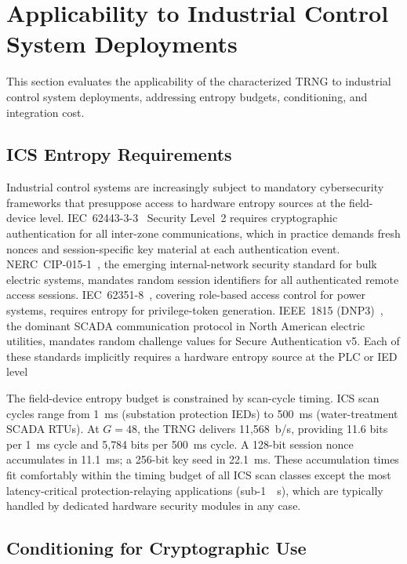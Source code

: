 \documentclass[conference]{IEEEtran}
\begin{document}
\section{Applicability to Industrial Control System Deployments}\label{sec:ics}
This section evaluates the applicability of the characterized TRNG to
industrial control system deployments, addressing entropy budgets,
conditioning, and integration cost.
\subsection{ICS Entropy Requirements}

Industrial control systems are increasingly subject to mandatory
cybersecurity frameworks that presuppose access to hardware entropy
sources at the field-device level.
IEC~62443-3-3~\cite{iec62443} Security Level~2 requires cryptographic
authentication for all inter-zone communications, which in practice
demands fresh nonces and session-specific key material at each
authentication event. NERC~CIP-015-1~\cite{nerc2024}, the emerging
internal-network security standard for bulk electric systems,
mandates random session identifiers for all authenticated remote
access sessions. IEC~62351-8~\cite{iec62351}, covering role-based
access control for power systems, requires entropy for privilege-token
generation. IEEE~1815 (DNP3)~\cite{ieee1815}, the dominant SCADA
communication protocol in North American electric utilities, mandates
random challenge values for Secure Authentication v5. Each of these
standards implicitly requires a hardware entropy source at the PLC or
IED level

The field-device entropy budget is constrained by scan-cycle timing.
ICS scan cycles range from \SI{1}{\milli\second} (substation
protection IEDs) to \SI{500}{\milli\second} (water-treatment SCADA
RTUs). At $G=48$, the TRNG delivers 11{,}568~b/s, providing 11.6 bits
per \SI{1}{\milli\second} cycle and 5{,}784 bits per
\SI{500}{\milli\second} cycle. A 128-bit session nonce accumulates in
\SI{11.1}{\milli\second}; a 256-bit key seed in
\SI{22.1}{\milli\second}. These accumulation times fit comfortably
within the timing budget of all ICS scan classes except the most
latency-critical protection-relaying applications (sub-\SI{1}{\milli%
\second}), which are typically handled by dedicated hardware security
modules in any case.

\subsection{Conditioning for Cryptographic Use}
\end{document}
